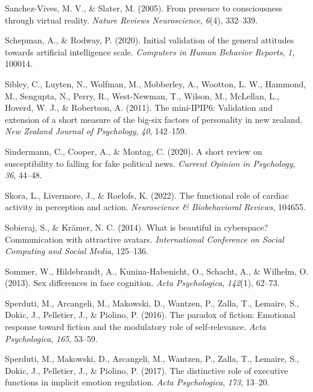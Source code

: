\documentclass[
  man,floatsintext]{apa6}
\newlength{\cslhangindent}
\newlength{\cslentryspacingunit} %
\newenvironment{CSLReferences}[2] %
 {%
  \setlength{\parindent}{0pt}
  \ifodd #1
  \let\oldpar\par
  \def\par{\hangindent=\cslhangindent\oldpar}
  \fi
  \setlength{\parskip}{#2\cslentryspacingunit}
 }%
 {}
\begin{document}
\begin{CSLReferences}{1}{0}
\leavevmode{}%
Sanchez-Vives, M. V., \& Slater, M. (2005). From presence to consciousness through virtual reality. \emph{Nature Reviews Neuroscience}, \emph{6}(4), 332--339.

\leavevmode{}%
Schepman, A., \& Rodway, P. (2020). Initial validation of the general attitudes towards artificial intelligence scale. \emph{Computers in Human Behavior Reports}, \emph{1}, 100014.

\leavevmode{}%
Sibley, C., Luyten, N., Wolfman, M., Mobberley, A., Wootton, L. W., Hammond, M., Sengupta, N., Perry, R., West-Newman, T., Wilson, M., McLellan, L., Hoverd, W. J., \& Robertson, A. (2011). The mini-IPIP6: Validation and extension of a short measure of the big-six factors of personality in new zealand. \emph{New Zealand Journal of Psychology}, \emph{40}, 142--159.

\leavevmode{}%
Sindermann, C., Cooper, A., \& Montag, C. (2020). A short review on susceptibility to falling for fake political news. \emph{Current Opinion in Psychology}, \emph{36}, 44--48.

\leavevmode{}%
Skora, L., Livermore, J., \& Roelofs, K. (2022). The functional role of cardiac activity in perception and action. \emph{Neuroscience \& Biobehavioral Reviews}, 104655.

\leavevmode{}%
Sobieraj, S., \& Krämer, N. C. (2014). What is beautiful in cyberspace? Communication with attractive avatars. \emph{International Conference on Social Computing and Social Media}, 125--136.

\leavevmode{}%
Sommer, W., Hildebrandt, A., Kunina-Habenicht, O., Schacht, A., \& Wilhelm, O. (2013). Sex differences in face cognition. \emph{Acta Psychologica}, \emph{142}(1), 62--73.

\leavevmode{}%
Sperduti, M., Arcangeli, M., Makowski, D., Wantzen, P., Zalla, T., Lemaire, S., Dokic, J., Pelletier, J., \& Piolino, P. (2016). The paradox of fiction: Emotional response toward fiction and the modulatory role of self-relevance. \emph{Acta Psychologica}, \emph{165}, 53--59.

\leavevmode{}%
Sperduti, M., Makowski, D., Arcangeli, M., Wantzen, P., Zalla, T., Lemaire, S., Dokic, J., Pelletier, J., \& Piolino, P. (2017). The distinctive role of executive functions in implicit emotion regulation. \emph{Acta Psychologica}, \emph{173}, 13--20.


\end{CSLReferences}
\end{document}
